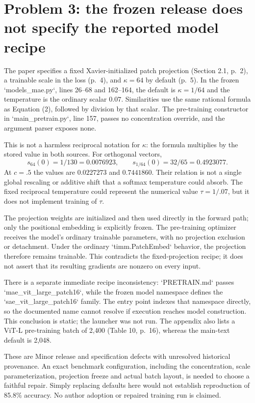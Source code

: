 \documentclass[10pt]{article}
\begin{document}
\section*{Problem 3: the frozen release does not specify the reported model recipe}
The paper specifies a fixed Xavier-initialized patch projection (Section 2.1, p. 2), a trainable scale in the loss (p. 4), and \(\kappa=64\) by default (p. 5). In the frozen `models\_mae.py`, lines 26–68 and 162–164, the default is \(\kappa=1/64\) and the temperature is the ordinary scalar \(0.07\). Similarities use the same rational formula as Equation (2), followed by division by that scalar. The pre-training constructor in `main\_pretrain.py`, line 157, passes no concentration override, and the argument parser exposes none.\par
This is not a harmless reciprocal notation for \(\kappa\): the formula multiplies by the stored value in both sources. For orthogonal vectors, \[s_{64}(0)=1/130=0.0076923,\qquad
 s_{1/64}(0)=32/65=0.4923077.\] At \(c=.5\) the values are \(0.0227273\) and \(0.7441860\). Their relation is not a single global rescaling or additive shift that a softmax temperature could absorb. The fixed reciprocal temperature could represent the numerical value \(\tau=1/.07\), but it does not implement training of \(\tau\).\par
The projection weights are initialized and then used directly in the forward path; only the positional embedding is explicitly frozen. The pre-training optimizer receives the model’s ordinary trainable parameters, with no projection exclusion or detachment. Under the ordinary `timm.PatchEmbed` behavior, the projection therefore remains trainable. This contradicts the fixed-projection recipe; it does not assert that its resulting gradients are nonzero on every input.\par
There is a separate immediate recipe inconsistency: `PRETRAIN.md` passes `mae\_vit\_large\_patch16`, while the frozen model namespace defines the `sae\_vit\_large\_patch16` family. The entry point indexes that namespace directly, so the documented name cannot resolve if execution reaches model construction. This conclusion is static; the launcher was not run. The appendix also lists a ViT-L pre-training batch of 2,400 (Table 10, p. 16), whereas the main-text default is 2,048.\par
These are Minor release and specification defects with unresolved historical provenance. An exact benchmark configuration, including the concentration, scale parameterization, projection freeze and actual batch layout, is needed to choose a faithful repair. Simply replacing defaults here would not establish reproduction of 85.8\% accuracy. No author adoption or repaired training run is claimed.\par
\end{document}
